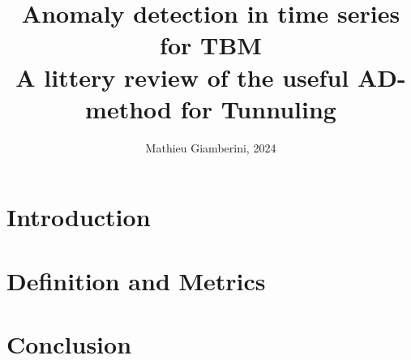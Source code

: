 \documentclass{article}
\title{Anomaly detection in time series for TBM \\ \small{A littery review of the useful AD-method for Tunnuling}}
\author{Mathieu Giamberini, 2024}
\date{}
\begin{document}
    \maketitle
    \begin{abstract}
        
    \end{abstract}
    
    \section*{Introduction}
    \section{Definition and Metrics}
    
    \section*{Conclusion}
\end{document}
